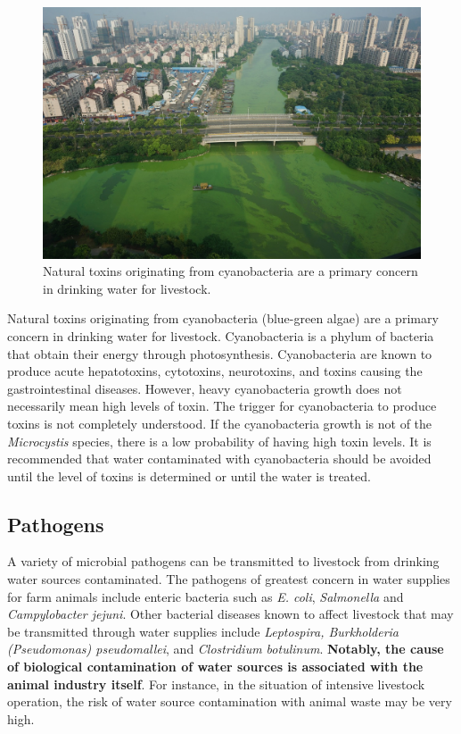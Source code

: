 \documentclass[]{book}
\begin{document}
\begin{figure}

{\centering \includegraphics[width=1\linewidth,height=1\textheight]{figures/cyanobacteria} 

}

\caption{Natural toxins originating from cyanobacteria are a primary concern in drinking water for livestock.}\label{fig:cyanobacteria}
\end{figure}

Natural toxins originating from cyanobacteria (blue-green algae) are a
primary concern in drinking water for livestock. Cyanobacteria is a
phylum of bacteria that obtain their energy through photosynthesis.
Cyanobacteria are known to produce acute hepatotoxins, cytotoxins,
neurotoxins, and toxins causing the gastrointestinal diseases. However,
heavy cyanobacteria growth does not necessarily mean high levels of
toxin. The trigger for cyanobacteria to produce toxins is not completely
understood. If the cyanobacteria growth is not of the \emph{Microcystis}
species, there is a low probability of having high toxin levels. It is
recommended that water contaminated with cyanobacteria should be avoided
until the level of toxins is determined or until the water is treated.

\subsection{Pathogens}\label{pathogens}

A variety of microbial pathogens can be transmitted to livestock from
drinking water sources contaminated. The pathogens of greatest concern
in water supplies for farm animals include enteric bacteria such as
\emph{E. coli}, \emph{Salmonella} and \emph{Campylobacter jejuni}. Other
bacterial diseases known to affect livestock that may be transmitted
through water supplies include \emph{Leptospira, Burkholderia
(Pseudomonas) pseudomallei}, and \emph{Clostridium botulinum}.
\textbf{Notably, the cause of biological contamination of water sources
is associated with the animal industry itself}. For instance, in the
situation of intensive livestock operation, the risk of water source
contamination with animal waste may be very high.
\end{document}
